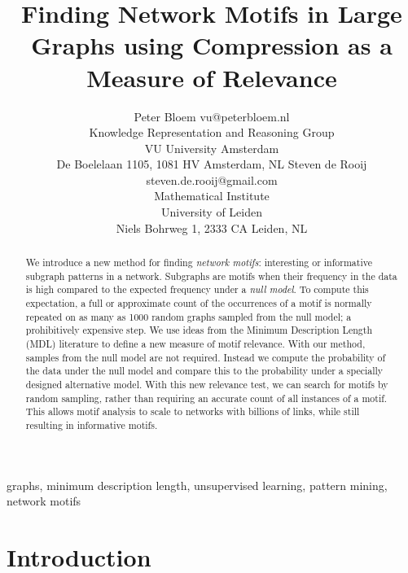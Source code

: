 \documentclass[twoside,11pt]{article}
\begin{document}
\title{Finding Network Motifs in Large Graphs using Compression as a Measure of Relevance}

\author{\name Peter Bloem \email vu@peterbloem.nl \\
       \addr Knowledge Representation and Reasoning Group\\
        VU University Amsterdam \\
		De Boelelaan 1105, 1081 HV Amsterdam, NL \AND
       \name Steven de Rooij \email steven.de.rooij@gmail.com \\
       \addr Mathematical Institute \\
        University of Leiden\\
        Niels Bohrweg 1, 2333 CA Leiden, NL}

\editor{\ldots}

\maketitle

\begin{abstract}%
We introduce a new method for finding \emph{network motifs}: interesting or informative subgraph patterns in a network. Subgraphs are motifs when their frequency in the data is high compared to the expected frequency under a \emph{null model}. To compute this expectation, a full or approximate count of the occurrences of a motif is normally repeated on as many as 1000 random graphs sampled from the null model; a prohibitively expensive step. We use ideas from the Minimum Description Length (MDL) literature to define a new measure of motif relevance. With our method, samples from the null model are not required. Instead we compute the probability of the data under the null model and compare this to the probability under a specially designed alternative model. With this new relevance test, we can search for motifs by random sampling, rather than requiring an accurate count of all instances of a motif. This allows motif analysis to scale to networks with billions of links, while still resulting in informative motifs. 
\end{abstract}

 \begin{keywords} graphs, minimum description length, unsupervised learning, pattern mining, network motifs \end{keywords}

\section{Introduction}
\end{document}
